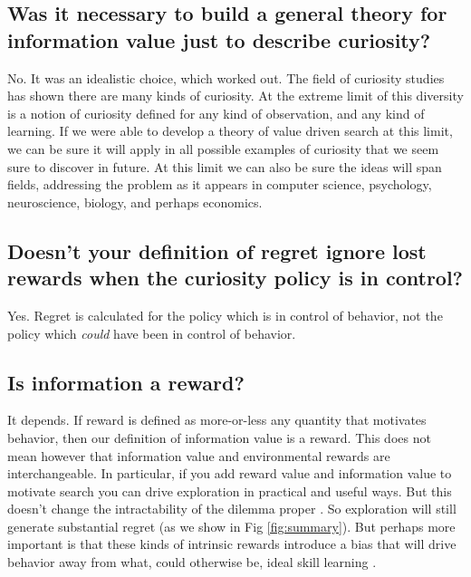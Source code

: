 \subsection*{Was it necessary to build a general theory for information value just to describe curiosity?}
No. It was an idealistic choice, which worked out. The field of curiosity studies has shown there are many kinds of curiosity. At the extreme limit of this diversity is a notion of curiosity defined for any kind of observation, and any kind of learning. If we were able to develop a theory of value driven search at this limit, we can be sure it will apply in all possible examples of curiosity that we seem sure to discover in future. At this limit we can also be sure the ideas will span fields, addressing the problem as it appears in computer science, psychology, neuroscience, biology, and perhaps economics.


\subsection{Doesn't your definition of regret ignore lost rewards when the curiosity policy is in control?}
Yes. Regret is calculated for the policy which is in control of behavior, not the policy which \textit{could} have been in control of behavior.


\subsection*{Is information a reward?}
It depends. If reward is defined as more-or-less any quantity that motivates behavior, then our definition of information value is a reward. This does not mean however that information value and environmental rewards are interchangeable. In particular, if you add reward value and information value to motivate search you can drive exploration in practical and useful ways. But this doesn't change the intractability of the dilemma proper \cite{Thrun1992a,Dayan1996,Findling2018,Gershman2018b}. So exploration will still generate substantial regret (as we show in Fig \ref{fig:summary}). But perhaps more important is that these kinds of intrinsic rewards \cite{Schmidhuber1991,Berger-Tal2014,Itti2009,Friston2016,Kobayashi2019} introduce a bias that will drive behavior away from what, could otherwise be, ideal skill learning \cite{Ng1999,Simsek2006}.


